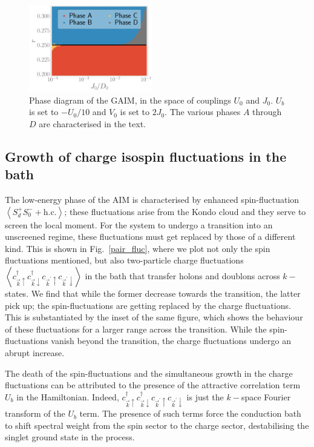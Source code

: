 \documentclass[reprint,superscriptaddress,floatfix]{revtex4-2}
\begin{document}
\begin{figure}[!htb]
	\includegraphics[width=0.48\textwidth]{phase-map-MIT.pdf}
	\caption{Phase diagram of the GAIM, in the space of couplings \(U_0\) and \(J_0\). \(U_b\) is set to \(-U_0/10\) and \(V_0\) is set to \(2J_0\). The various phases \(A\) through \(D\) are characterised in the text.}
	\label{phase-diag}
\end{figure}

\subsection{Growth of charge isospin fluctuations in the bath}
The low-energy phase of the AIM is characterised by enhanced spin-fluctuation \(\left<S_d^+S_0^- + \text{h.c.}\right>\); these fluctuations arise from the Kondo cloud and they serve to screen the local moment. For the system to undergo a transition into an unscreened regime, these fluctuations must get replaced by those of a different kind. This is shown in Fig.~\ref{pair_fluc}, where we plot not only the spin fluctuations mentioned, but also two-particle charge fluctuations \(\left<c^\dagger_{\vec k \uparrow} c^\dagger_{\vec k \downarrow} c_{\vec k^\prime \uparrow} c_{\vec k^\prime \downarrow}\right>\) in the bath that transfer holons and doublons across \(k-\)states. We find that while the former decrease towards the transition, the latter pick up; the spin-fluctuations are getting replaced by the charge fluctuations. This is substantiated by the inset of the same figure, which shows the behaviour of these fluctuations for a larger range across the transition. While the spin-fluctuations vanish beyond the transition, the charge fluctuations undergo an abrupt increase.

{\color{blue}The death of the spin-fluctuations and the simultaneous growth in the charge fluctuations can be attributed to the presence of the attractive correlation term \(U_b\) in the Hamiltonian. Indeed, \(c^\dagger_{\vec k \uparrow} c^\dagger_{\vec k \downarrow} c_{\vec k^\prime \uparrow} c_{\vec k^\prime \downarrow}\) is just the \(k-\)space Fourier transform of the \(U_b\) term. The presence of such terms force the conduction bath to shift spectral weight from the spin sector to the charge sector, destabilising the singlet ground state in the process.}
\end{document}
